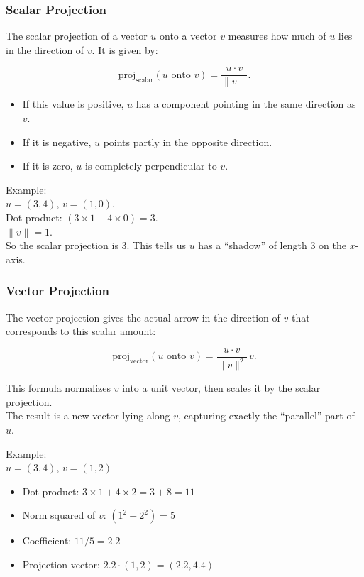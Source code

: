 \documentclass[
  letterpaper,
  DIV=11,
  numbers=noendperiod]{scrreprt}
\providecommand{\tightlist}{%
  \setlength{\itemsep}{0pt}\setlength{\parskip}{0pt}}
\begin{document}
\subsubsection{Scalar Projection}\label{scalar-projection}

The scalar projection of a vector \(u\) onto a vector \(v\) measures how
much of \(u\) lies in the direction of \(v\). It is given by:

\[
\text{proj}_{\text{scalar}}(u \text{ onto } v) = \frac{u \cdot v}{\|v\|}.
\]

\begin{itemize}
\tightlist
\item
  If this value is positive, \(u\) has a component pointing in the same
  direction as \(v\).\\
\item
  If it is negative, \(u\) points partly in the opposite direction.\\
\item
  If it is zero, \(u\) is completely perpendicular to \(v\).
\end{itemize}

Example:\\
\(u = (3, 4)\), \(v = (1, 0)\).\\
Dot product: \((3 \times 1 + 4 \times 0) = 3\).\\
\(\|v\| = 1\).\\
So the scalar projection is \(3\). This tells us \(u\) has a ``shadow''
of length \(3\) on the \(x\)-axis.

\subsubsection{Vector Projection}\label{vector-projection}

The vector projection gives the actual arrow in the direction of \(v\)
that corresponds to this scalar amount:

\[
\text{proj}_{\text{vector}}(u \text{ onto } v) = \frac{u \cdot v}{\|v\|^2} \, v.
\]

This formula normalizes \(v\) into a unit vector, then scales it by the
scalar projection.\\
The result is a new vector lying along \(v\), capturing exactly the
``parallel'' part of \(u\).

Example:\\
\(u = (3, 4)\), \(v = (1, 2)\)

\begin{itemize}
\tightlist
\item
  Dot product: \(3 \times 1 + 4 \times 2 = 3 + 8 = 11\)\\
\item
  Norm squared of \(v\): \((1^2 + 2^2) = 5\)\\
\item
  Coefficient: \(11 / 5 = 2.2\)\\
\item
  Projection vector: \(2.2 \cdot (1, 2) = (2.2, 4.4)\)
\end{itemize}
\end{document}
